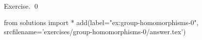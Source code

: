 \begin{prop}
  \label{ex:group-homomorphisms-0}
  
\end{prop}
\proof
Exercise.
  \qed
\begin{python0}
from solutions import *
add(label="ex:group-homomorphisms-0",
    srcfilename='exercises/group-homomorphisms-0/answer.tex') 
\end{python0}                              

